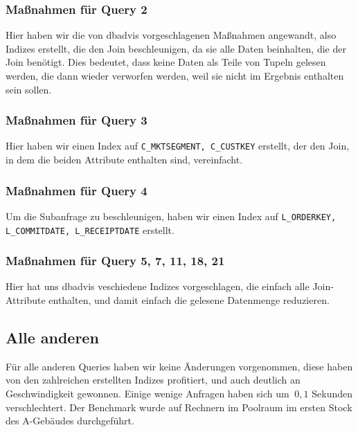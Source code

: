 \documentclass[12pt]{article}
\begin{document}
\subsubsection*{Maßnahmen für Query 2}
Hier haben wir die von dbadvis vorgeschlagenen Maßnahmen angewandt, also Indizes
erstellt, die den Join beschleunigen, da sie alle Daten beinhalten, die der Join
benötigt. Dies bedeutet, dass keine Daten als Teile von Tupeln gelesen werden,
die dann wieder verworfen werden, weil sie nicht im Ergebnis enthalten sein
sollen.

\subsubsection*{Maßnahmen für Query 3}
Hier haben wir einen Index auf \verb=C_MKTSEGMENT, C_CUSTKEY= erstellt, der
den Join, in dem die beiden Attribute enthalten sind, vereinfacht.

\subsubsection*{Maßnahmen für Query 4}
Um die Subanfrage zu beschleunigen, haben wir einen Index auf \verb=L_ORDERKEY, L_COMMITDATE, L_RECEIPTDATE= erstellt.

\subsubsection*{Maßnahmen für Query 5, 7, 11, 18, 21}
Hier hat uns dbadvis veschiedene Indizes vorgeschlagen, die einfach alle
Join-Attribute enthalten, und damit einfach die gelesene Datenmenge
reduzieren.

\subsection{Alle anderen}
Für alle anderen Queries haben wir keine Änderungen vorgenommen, diese haben von
den zahlreichen erstellten Indizes profitiert, und auch deutlich an
Geschwindigkeit gewonnen. Einige wenige Anfragen haben sich um $~0,1$ Sekunden
verschlechtert. Der Benchmark wurde auf Rechnern im Poolraum im ersten Stock des
A-Gebäudes durchgeführt.
\end{document}
